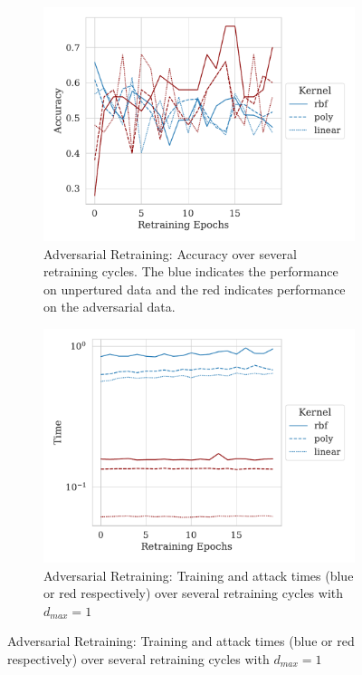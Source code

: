 \documentclass[runningheads]{llncs}
\begin{document}
\begin{figure}
     \centering
     \begin{subfigure}[b]{0.45\textwidth}
         \centering
         \includegraphics[width=\textwidth]{./generated/retrain_accuracy.pdf}
         \caption{Adversarial Retraining: Accuracy over several retraining cycles. The blue indicates the performance on unpertured data and the red indicates performance on the adversarial data.}
        \label{fig:retrain_acc}
     \end{subfigure}
     \hfill
     \begin{subfigure}[b]{0.45\textwidth}
         \centering
         \includegraphics[width=\textwidth]{./generated/retrain_time.pdf}
         \caption{Adversarial Retraining: Training and attack times (blue or red respectively) over several retraining cycles with $d_{max} = 1$}

\end{subfigure}
\end{figure}
\end{document}
